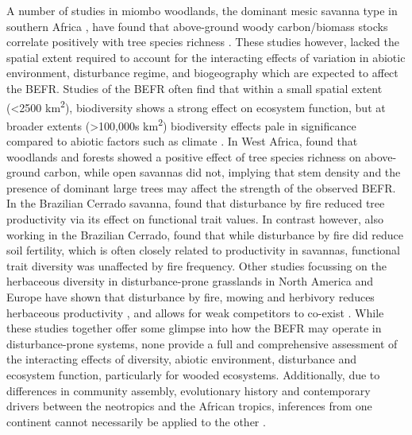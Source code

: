 \documentclass[11pt,a4paper]{article}
\begin{document}
A number of studies in miombo woodlands, the dominant mesic savanna type in southern Africa \citep{Campbell1996}, have found that above-ground woody carbon/biomass stocks correlate positively with tree species richness \citep{McNicol2018, Shirima2015, Mutowo2012}. These studies however, lacked the spatial extent required to account for the interacting effects of variation in abiotic environment, disturbance regime, and biogeography which are expected to affect the BEFR. Studies of the BEFR often find that within a small spatial extent (<2500 km\textsuperscript{2}), biodiversity shows a strong effect on ecosystem function, but at broader extents (>100,000s km\textsuperscript{2}) biodiversity effects pale in significance compared to abiotic factors such as climate \citep{Gonzalez2020}. In West Africa, \citet{Mensah2020} found that woodlands and forests showed a positive effect of tree species richness on above-ground carbon, while open savannas did not, implying that stem density and the presence of dominant large trees may affect the strength of the observed BEFR. In the Brazilian Cerrado savanna, \citet{Loiola2015} found that disturbance by fire reduced tree productivity via its effect on functional trait values. In contrast however, \citet{Carvalho2014} also working in the Brazilian Cerrado, found that while disturbance by fire did reduce soil fertility, which is often closely related to productivity in savannas, functional trait diversity was unaffected by fire frequency. Other studies focussing on the herbaceous diversity in disturbance-prone grasslands in North America and Europe have shown that disturbance by fire, mowing and herbivory reduces herbaceous productivity \citep{Grace2007}, and allows for weak competitors to co-exist \citep{Mason2011}. While these studies together offer some glimpse into how the BEFR may operate in disturbance-prone systems, none provide a full and comprehensive assessment of the interacting effects of diversity, abiotic environment, disturbance and ecosystem function, particularly for wooded ecosystems. Additionally, due to differences in community assembly, evolutionary history and contemporary drivers between the neotropics and the African tropics, inferences from one continent cannot necessarily be applied to the other \citep{Dexter2015}.
\end{document}
